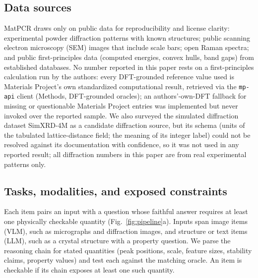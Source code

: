 \documentclass[pdflatex,sn-nature]{sn-jnl}
\begin{document}
\subsection*{Data sources}
MatPCR draws only on public data for reproducibility and license clarity: experimental
powder diffraction patterns with known structures;\cite{opxrd2025} public scanning electron microscopy (SEM) images that include scale bars;\cite{aversa2018nffa} open Raman spectra;\cite{lafuente2015rruff} and public first-principles data (computed energies, convex hulls, band gaps) from established databases.\cite{matproj2013} No number reported in this paper rests on a first-principles calculation run by the authors: every DFT-grounded reference value used is Materials Project's own standardized computational result, retrieved via the \texttt{mp-api} client (Methods, DFT-grounded oracles); an authors'-own-DFT fallback for missing or questionable Materials Project entries was implemented but never invoked over the reported sample. We also surveyed the simulated diffraction dataset SimXRD-4M\cite{simxrd2024} as a candidate diffraction source, but its schema (units of the tabulated lattice-distance field; the meaning of its integer label) could not be resolved against its documentation with confidence, so it was not used in any reported result; all diffraction numbers in this paper are from real experimental
patterns only.

\subsection*{Tasks, modalities, and exposed constraints}
Each item pairs an input with a question whose faithful answer requires at least one
physically checkable quantity (Fig.~\ref{fig:pipeline}a). Inputs span image items (VLM), such as micrographs and diffraction images, and structure or text items (LLM), such as a crystal structure with a property question. We parse the reasoning chain for stated quantities (peak positions, scale, feature sizes, stability claims, property values) and test each against the matching oracle. An item is checkable if its chain exposes at least one such quantity.
\end{document}
